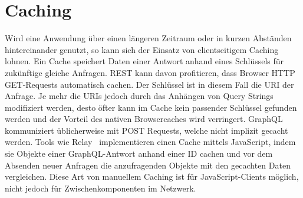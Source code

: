 \section{Caching}
Wird eine Anwendung über einen längeren Zeitraum oder in kurzen Abständen hintereinander genutzt, so kann sich der Einsatz von clientseitigem Caching lohnen.
Ein Cache speichert Daten einer Antwort anhand eines Schlüssels für zukünftige gleiche Anfragen. 
REST kann davon profitieren, dass Browser HTTP GET-Requests automatisch cachen.
Der Schlüssel ist in diesem Fall die URI der Anfrage.
Je mehr die URIs jedoch durch das Anhängen von Query Strings modifiziert werden, desto öfter kann im Cache kein passender Schlüssel gefunden werden und der Vorteil des nativen Browsercaches wird verringert.
GraphQL kommuniziert üblicherweise mit POST Requests, welche nicht implizit gecacht werden.
Tools wie Relay~\cite{Relay} implementieren einen Cache mittels JavaScript, indem sie Objekte einer GraphQL-Antwort anhand einer ID cachen und vor dem Absenden neuer Anfragen die anzufragenden Objekte mit den gecachten Daten vergleichen.
Diese Art von manuellem Caching ist für JavaScript-Clients möglich, nicht jedoch für Zwischenkomponenten im Netzwerk.

